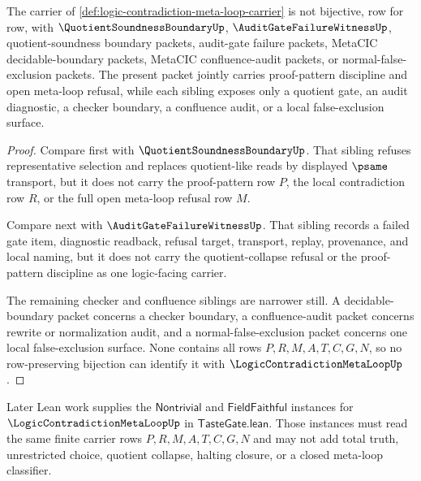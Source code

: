 \begin{theorem}
\label{thm:logic-contradiction-meta-loop-sibling-dependency}
The carrier of \autoref{def:logic-contradiction-meta-loop-carrier} is not bijective, row for row, with $\QuotientSoundnessBoundaryUp$, $\AuditGateFailureWitnessUp$, quotient-soundness boundary packets, audit-gate failure packets, MetaCIC decidable-boundary packets, MetaCIC confluence-audit packets, or normal-false-exclusion packets. The present packet jointly carries proof-pattern discipline and open meta-loop refusal, while each sibling exposes only a quotient gate, an audit diagnostic, a checker boundary, a confluence audit, or a local false-exclusion surface.
\end{theorem}
\begin{proof}
Compare first with $\QuotientSoundnessBoundaryUp$. That sibling refuses representative selection and replaces quotient-like reads by displayed $\psame$ transport, but it does not carry the proof-pattern row $P$, the local contradiction row $R$, or the full open meta-loop refusal row $M$.

Compare next with $\AuditGateFailureWitnessUp$. That sibling records a failed gate item, diagnostic readback, refusal target, transport, replay, provenance, and local naming, but it does not carry the quotient-collapse refusal or the proof-pattern discipline as one logic-facing carrier.

The remaining checker and confluence siblings are narrower still. A decidable-boundary packet concerns a checker boundary, a confluence-audit packet concerns rewrite or normalization audit, and a normal-false-exclusion packet concerns one local false-exclusion surface. None contains all rows $P,R,M,A,T,C,G,N$, so no row-preserving bijection can identify it with $\LogicContradictionMetaLoopUp$.
\end{proof}

Later Lean work supplies the $\mathsf{Nontrivial}$ and $\mathsf{FieldFaithful}$ instances for $\LogicContradictionMetaLoopUp$ in $\mathsf{TasteGate.lean}$. Those instances must read the same finite carrier rows $P,R,M,A,T,C,G,N$ and may not add total truth, unrestricted choice, quotient collapse, halting closure, or a closed meta-loop classifier.


